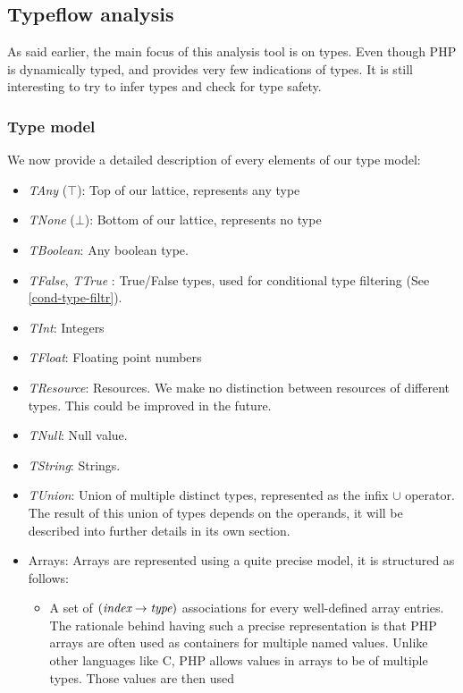 \documentclass[a4paper]{article}
\begin{document}
\subsection{Typeflow analysis}
As said earlier, the main focus of this analysis tool is on types. Even though
PHP is dynamically typed, and provides very few indications of types. It is
still interesting to try to infer types and check for type safety.

\subsubsection{Type model}
We now provide a detailed description of every elements of our type model:
\begin{itemize}
  \item \emph{TAny} ($\top$): Top of our lattice, represents any type
  \item \emph{TNone} ($\bot$): Bottom of our lattice, represents no type
  \item \emph{TBoolean}: Any boolean type.
  \item \emph{TFalse}, \emph{TTrue} : True/False types, used for conditional
    type filtering (See \ref{cond-type-filtr}).
  \item \emph{TInt}: Integers
  \item \emph{TFloat}: Floating point numbers
  \item \emph{TResource}: Resources. We make no distinction between resources
    of different types. This could be improved in the future.
  \item \emph{TNull}: Null value.
  \item \emph{TString}: Strings.
  \item \emph{TUnion}: Union of multiple distinct types, represented as the
    infix $\cup$ operator. The result of this union of types depends on the operands,
    it will be described into further details in its own section.
  \item Arrays: Arrays are represented using a quite precise model, it is
    structured as follows:
    \begin{itemize}
      \item A set of $(\emph{index} \rightarrow \emph{type})$ associations for
          every well-defined array entries. The rationale behind having such a precise
          representation is that PHP arrays are often used as containers for
          multiple named values. Unlike other languages like C, PHP allows values
          in arrays to be of multiple types. Those values are then used

\end{itemize}
\end{itemize}
\end{document}
